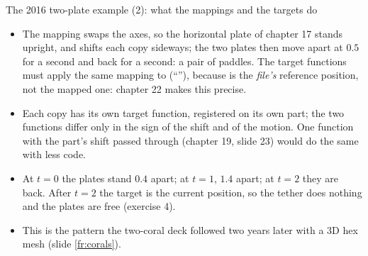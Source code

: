 \documentclass[aspectratio=169,11pt]{beamer}
\begin{document}
\begin{frame}{The 2016 two-plate example (2): what the mappings and the targets do}
\label{fr:multi2}
\footnotesize
\begin{itemize}
  \item The mapping swaps the axes, so the horizontal plate of chapter 17 stands upright, and shifts each copy sideways; the two plates then move apart at $0.5$ for a second and back for a second: a pair of paddles. The target functions must apply the same mapping to  (``''), because  is the \emph{file's} reference position, not the mapped one: chapter 22 makes this precise.
  \item Each copy has its own target function, registered on its own part; the two functions differ only in the sign of the shift and of the motion. One function with the part's shift passed through  (chapter 19, slide 23) would do the same with less code.
  \item At $t = 0$ the plates stand $0.4$ apart; at $t = 1$, $1.4$ apart; at $t = 2$ they are back. After $t = 2$ the target is the current position, so the tether does nothing and the plates are free (exercise 4).
  \item This is the pattern the two-coral deck followed two years later with a 3D hex mesh (slide \ref{fr:corals}).
\end{itemize}
\end{frame}
\end{document}
